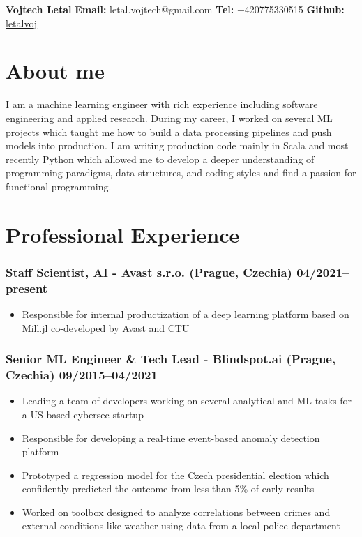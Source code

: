 \documentclass[11pt]{article}
\begin{document}
\clearpage
\thispagestyle{empty}
{\center\bfseries\huge Vojtech Letal}
\hfill
{\bf Email:} letal.vojtech@gmail.com
{\bf Tel:} +420775330515
{\bf Github:} \href{http://github.com/letalvoj}{letalvoj}

\section*{About me}
I am a machine learning engineer with rich experience including software engineering and applied research.
During my career, I worked on several ML projects which taught me how to build a data processing pipelines and push models into production.
I am writing production code mainly in Scala and most recently Python which allowed me to develop a deeper understanding of programming paradigms, data structures, and coding styles and find a passion for functional programming.

\section*{Professional Experience}
\subsubsection*{\bf Staff Scientist, AI - Avast s.r.o. (Prague, Czechia) \hfill 04/2021--present}
	 \begin{itemize}
		\setlength\itemsep{-0.25em}
		\item Responsible for internal productization of a deep learning platform based on Mill.jl co-developed by Avast and CTU
	 \end{itemize}

\subsubsection*{\bf Senior ML Engineer \& Tech Lead - Blindspot.ai (Prague, Czechia) \hfill 09/2015--04/2021}
	 \begin{itemize}
		\setlength\itemsep{-0.25em}
		\item Leading a team of developers working on several analytical and ML tasks for a US-based cybersec startup
		\item Responsible for developing a real-time event-based anomaly detection platform
		\item Prototyped a regression model for the Czech presidential election which confidently predicted the outcome from less than 5\% of early results
		\item Worked on toolbox designed to analyze correlations between crimes and external conditions like weather using data from a local police department
	 \end{itemize}
\end{document}
